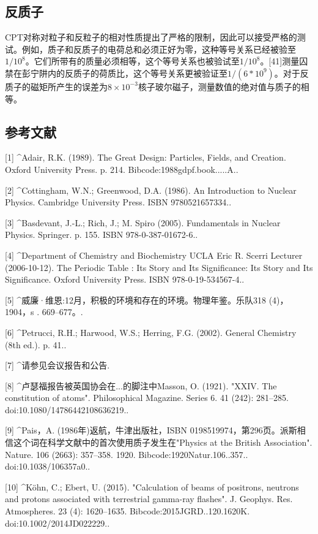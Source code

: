 \subsection{ 反质子}
CPT对称对粒子和反粒子的相对性质提出了严格的限制，因此可以接受严格的测试。例如，质子和反质子的电荷总和必须正好为零，这种等号关系已经被验至$1/10^{8}$。它们所带有的质量必须相等，这个等号关系也被验试至$1/10^{8}$。[41]测量囚禁在彭宁阱内的反质子的荷质比，这个等号关系更被验证至$1/(6*10^9)$。对于反质子的磁矩所产生的误差为$8\times10^{-3}$核子玻尔磁子，测量数值的绝对值与质子的相等。

\subsection{参考文献}
[1]
^Adair, R.K. (1989). The Great Design: Particles, Fields, and Creation. Oxford University Press. p. 214. Bibcode:1988gdpf.book.....A..

[2]
^Cottingham, W.N.; Greenwood, D.A. (1986). An Introduction to Nuclear Physics. Cambridge University Press. ISBN 9780521657334..

[3]
^Basdevant, J.-L.; Rich, J.; M. Spiro (2005). Fundamentals in Nuclear Physics. Springer. p. 155. ISBN 978-0-387-01672-6..

[4]
^Department of Chemistry and Biochemistry UCLA Eric R. Scerri Lecturer (2006-10-12). The Periodic Table : Its Story and Its Significance: Its Story and Its Significance. Oxford University Press. ISBN 978-0-19-534567-4..

[5]
^威廉·维恩:12月，积极的环境和存在的环境。物理年鉴。乐队318 (4)，1904，s . 669–677。.

[6]
^Petrucci, R.H.; Harwood, W.S.; Herring, F.G. (2002). General Chemistry (8th ed.). p. 41..

[7]
^请参见会议报告和公告.

[8]
^卢瑟福报告被英国协会在...的脚注中Masson, O. (1921). "XXIV. The constitution of atoms". Philosophical Magazine. Series 6. 41 (242): 281–285. doi:10.1080/14786442108636219..

[9]
^Pais，A. (1986年)返航，牛津出版社，ISBN 0198519974，第296页。派斯相信这个词在科学文献中的首次使用质子发生在"Physics at the British Association". Nature. 106 (2663): 357–358. 1920. Bibcode:1920Natur.106..357.. doi:10.1038/106357a0..

[10]
^Köhn, C.; Ebert, U. (2015). "Calculation of beams of positrons, neutrons and protons associated with terrestrial gamma-ray flashes". J. Geophys. Res. Atmospheres. 23 (4): 1620–1635. Bibcode:2015JGRD..120.1620K. doi:10.1002/2014JD022229..

